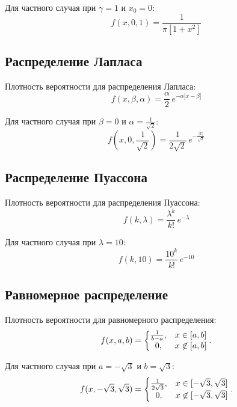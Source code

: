 Для частного случая при \( \gamma = 1 \) и \( x_0 = 0 \):
\begin{equation} 
f(x, 0, 1) =  \frac{1}{\pi \left[1 + {x}^2\right]}
\end{equation}


\subsection{Распределение Лапласа}
Плотность вероятности для распределения Лапласа:
\begin{equation} 
f(x, \beta, \alpha) = \frac{\alpha}{2} \, e^{-\alpha|x - \beta|}
\end{equation}

Для частного случая при \( \beta = 0 \) и \( \alpha = \frac{1}{\sqrt{2}} \):
\begin{equation} 
f(x, 0, \frac{1}{\sqrt{2}}) = \frac{1}{2\sqrt{2}} \, e^{-\frac{|x|}{\sqrt{2}}}
\end{equation}


\subsection{Распределение Пуассона}

Плотность вероятности для распределения Пуассона:
\begin{equation} 
f(k, \lambda) = \frac{\lambda^k}{k!}\, e^{-\lambda}
\end{equation}

Для частного случая при \( \lambda = 10 \):
\begin{equation} 
f(k, 10) = \frac{10^k}{k!}\, e^{-10}
\end{equation}

\subsection{Равномерное распределение}
Плотность вероятности для равномерного распределения:
\begin{equation} 
f(x, a, b) = \left\{
\begin{matrix}
{1 \over b-a}, & x\in [a,b] \\
0, & x\not\in [a,b]
\end{matrix}
\right..
\end{equation}

Для частного случая при \( a = -\sqrt{3} \) и \( b = \sqrt{3} \):
\begin{equation} 
f(x, -\sqrt{3}, \sqrt{3}) = \left\{
\begin{matrix}
{1 \over 2\sqrt{3}}, & x\in [-\sqrt{3},\sqrt{3}] \\
0, & x\not\in [-\sqrt{3},\sqrt{3}]
\end{matrix}
\right..
\end{equation}



